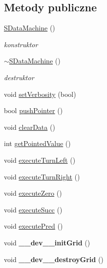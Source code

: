 \subsection*{Metody publiczne}
\begin{CompactItemize}
\item 
\hyperlink{classSDataMachine_3d894df00bd2283c717a827e27138812}{SDataMachine} ()
\begin{CompactList}\small\item\em konstruktor \item\end{CompactList}\item 
\hyperlink{classSDataMachine_59bc85b25930729cbe3046e81f49f909}{$\sim$SDataMachine} ()
\begin{CompactList}\small\item\em destruktor \item\end{CompactList}\item 
void \hyperlink{classSDataMachine_38cc38f27606be24fc609d461d25ae2f}{setVerbosity} (bool)
\item 
bool \hyperlink{classSDataMachine_10eb8f56cf6235455a26c5c673b8fe15}{pushPointer} ()
\item 
void \hyperlink{classSDataMachine_b863ea9a42568d7555cc146ded9f2d88}{clearData} ()
\item 
int \hyperlink{classSDataMachine_3a191be9cab718274d6bd75e01cc2a26}{getPointedValue} ()
\item 
void \hyperlink{classSDataMachine_5b46d50c18bec1bcfd5232bec3875fd5}{executeTurnLeft} ()
\item 
void \hyperlink{classSDataMachine_fb6f52c7f14afa51eed848f354d57924}{executeTurnRight} ()
\item 
void \hyperlink{classSDataMachine_27c3e6dfe9ac45f9d5eed7c97f96abd8}{executeZero} ()
\item 
void \hyperlink{classSDataMachine_85832e07e2fb8ae32160fe0c95a487d2}{executeSucc} ()
\item 
void \hyperlink{classSDataMachine_87cfad868b3ea0a0e60f776ad3773678}{executePred} ()
\item 
\hypertarget{classSDataMachine_9680a908e0343de539ffd7a83d17dd11}{
void \textbf{\_\-\_\-dev\_\-\_\-initGrid} ()}
\label{classSDataMachine_9680a908e0343de539ffd7a83d17dd11}

\item 
\hypertarget{classSDataMachine_66c35c3c879c06903f306825ccaade7f}{
void \textbf{\_\-\_\-dev\_\-\_\-destroyGrid} ()}
\label{classSDataMachine_66c35c3c879c06903f306825ccaade7f}


\end{CompactItemize}
